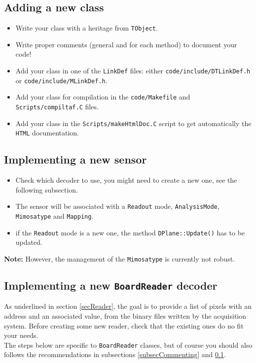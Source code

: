 \documentclass[a4paper, 12pt, twoside]{article}
\begin{document}
\subsection{Adding a new class}
\label{subsecAddingClass}

\begin{itemize}
\item Write your class with a heritage from {\tt TObject}.
\item Write proper comments (general and for each method) to document your code!
\item Add your class in one of the {\tt LinkDef} files: either {\tt code/include/DTLinkDef.h} or {\tt code/include/MLinkDef.h}.
\item Add your class for compilation in the {\tt code/Makefile} and {\tt Scripts/compiltaf.C} files.
\item Add your class in the {\tt Scripts/makeHtmlDoc.C} script to get automatically the {\tt HTML} documentation.
\end{itemize}


\subsection{Implementing a new sensor}

\begin{itemize}
\item Check which decoder to use, you might need to create a new one, see the following subsection.
\item The sensor will be associated with a {\tt Readout} mode, {\tt AnalysisMode}, {\tt Mimosatype} and {\tt Mapping}.
\item if the {\tt Readout} mode is a new one, the method {\tt DPlane::Update()} has to be updated.
\end{itemize}

\noindent
{\bf Note:} However, the management of the {\tt Mimosatype} is currently not robust.


\subsection{Implementing a new {\tt BoardReader} decoder}

As underlined in section \ref{secReader}, the goal is to provide a list of pixels with an address and an associated value, from the binary files written by the acquisition system. Before creating some new reader, check that the existing ones do no fit your needs.\\
The steps below are specific to {\tt BoardReader} classes, but of course you should also follows the recommendations in subsections \ref{subsecCommenting} and \ref{subsecAddingClass}.
\end{document}
